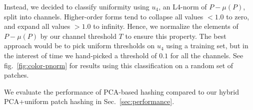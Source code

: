 Instead, we decided to classify uniformity using $u_4$, an L4-norm
of $P-\mu(P)$, split into channels. Higher-order forms tend
to collapse all values $< 1.0$ to zero, and expand all values $> 1.0$
to infinity. Hence, we normalize the elements of $P-\mu(P)$ by
our channel threshold $T$ to ensure this property. The best
approach would be to pick uniform thresholds on $u_4$ using
a training set, but in the interest of time we hand-picked
a threshold of $0.1$ for all the channels. See fig.~\ref{fig:color-pnorm}
for results using this classification on a random set of patches.

We evaluate the performance of PCA-based hashing compared to
our hybrid PCA+uniform patch hashing in Sec.~\ref{sec:performance}.
